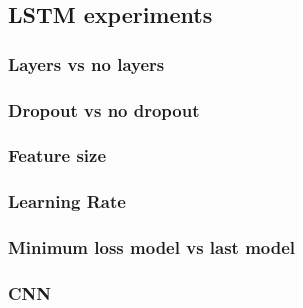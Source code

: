 \subsection{LSTM experiments}

\subsubsection{Layers vs no layers}


\subsubsection{Dropout vs no dropout}


\subsubsection{Feature size}


\subsubsection{Learning Rate}


\subsubsection{Minimum loss model vs last model} %
%

\subsubsection{CNN}

